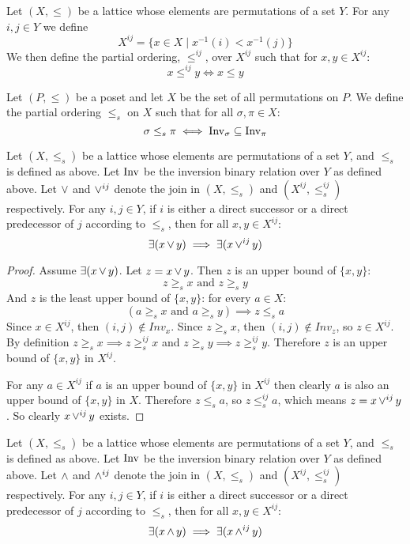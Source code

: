 	\begin{definition}[$X^{ij}, \le^{ij}$]
		Let $(X, \le)$ be a lattice whose elements are permutations of a set $Y$. For any $i,j \in Y$ we define
		\[
			X^{ij} = \{ x \in X \mid x^{-1}(i) < x^{-1}(j) \}
		\]
		We then define the partial ordering, $\le^{ij}$, over $X^{ij}$ such that for $x, y \in X^{ij}$:
		\[
			x \le^{ij} y \iff x \le y
		\]
	\end{definition}

	\begin{definition}[$\le_s$]
		Let $(P, \le)$ be a poset and let $X$ be the set of all permutations on $P$. We define the partial ordering $\le_s$ on $X$ such that for all $\sigma, \pi \in X$:
		\[
			\sigma \le_s \pi \iff \operatorname{Inv}_{\sigma} \subseteq \operatorname{Inv}_{\pi}
		\]
	\end{definition}

	\begin{lemma}
		\label{identified-permutation-lattice-join}
		Let $(X, \le_s)$ be a lattice whose elements are permutations of a set $Y$, and $\le_s$ is defined as above. Let $\operatorname{Inv}$ be the inversion binary relation over $Y$ as defined above. Let $\operatorname{\vee}$ and $\operatorname{\vee}^{ij}$ denote the join in $(X, \le_s)$ and $(X^{ij}, \le^{ij}_s)$ respectively. For any $i,j \in Y$, if $i$ is either a direct successor or a direct predecessor of $j$ according to $\le_s$, then for all $x, y \in X^{ij}$:
		\[
			\exists(x \operatorname{\vee} y) \implies \exists(x \operatorname{\vee}^{ij} y)
		\]
	\end{lemma}

	\begin{proof}
		Assume $\exists(x \operatorname{\vee} y)$. Let $z = x \operatorname{\vee} y$. Then $z$ is an upper bound of $\{x, y\}$:
		\[
			z \ge_s x \textrm{ and } z \ge_s y
		\]
		And $z$ is the least upper bound of $\{x, y\}$: for every $a \in X$:
		\[
			(a \ge_s x \textrm{ and } a \ge_s y) \implies z \le_s a
		\]
		Since $x \in X^{ij}$, then $(i, j) \notin Inv_x$. Since $z \ge_s x$, then $(i, j) \notin Inv_z$, so $z \in X^{ij}$. By definition $z \ge_s x \implies z \ge^{ij}_s x$ and $z \ge_s y \implies z \ge^{ij}_s y$. Therefore $z$ is an upper bound of $\{x, y\}$ in $X^{ij}$.

		For any $a \in X^{ij}$ if $a$ is an upper bound of $\{x, y\}$ in $X^{ij}$ then clearly $a$ is also an upper bound of $\{x, y\}$ in $X$. Therefore $z \le_s a$, so $z \le^{ij}_s a$, which means $z = x \operatorname{\vee}^{ij} y$. So clearly $x \operatorname{\vee}^{ij} y$ exists.
	\end{proof}

	\begin{lemma}
		\label{identified-permutation-lattice-meet}
		Let $(X, \le_s)$ be a lattice whose elements are permutations of a set $Y$, and $\le_s$ is defined as above. Let $\operatorname{Inv}$ be the inversion binary relation over $Y$ as defined above. Let $\operatorname{\wedge}$ and $\operatorname{\wedge}^{ij}$ denote the join in $(X, \le_s)$ and $(X^{ij}, \le^{ij}_s)$ respectively. For any $i,j \in Y$, if $i$ is either a direct successor or a direct predecessor of $j$ according to $\le_s$, then for all $x, y \in X^{ij}$:
		\[
			\exists(x \operatorname{\wedge} y) \implies \exists(x \operatorname{\wedge}^{ij} y)
		\]
	\end{lemma}

